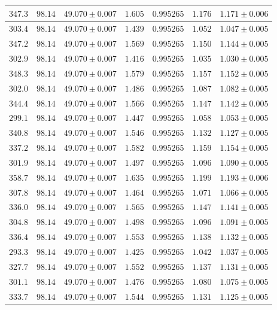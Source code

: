 \documentclass[]{article}
\begin{document}
\begin{table}
\begin{tabular}{||c|c|c|c|c|c|c||}
    $347.3$ & $98.14$ & $49.070 \pm 0.007$ & $1.605$ & $0.995265$ & $1.176$ & $1.171 \pm 0.006$ \\\hline
    $303.4$ & $98.14$ & $49.070 \pm 0.007$ & $1.439$ & $0.995265$ & $1.052$ & $1.047 \pm 0.005$ \\\hline
    $347.2$ & $98.14$ & $49.070 \pm 0.007$ & $1.569$ & $0.995265$ & $1.150$ & $1.144 \pm 0.005$ \\\hline
    $302.9$ & $98.14$ & $49.070 \pm 0.007$ & $1.416$ & $0.995265$ & $1.035$ & $1.030 \pm 0.005$ \\\hline
    $348.3$ & $98.14$ & $49.070 \pm 0.007$ & $1.579$ & $0.995265$ & $1.157$ & $1.152 \pm 0.005$ \\\hline
    $302.0$ & $98.14$ & $49.070 \pm 0.007$ & $1.486$ & $0.995265$ & $1.087$ & $1.082 \pm 0.005$ \\\hline
    $344.4$ & $98.14$ & $49.070 \pm 0.007$ & $1.566$ & $0.995265$ & $1.147$ & $1.142 \pm 0.005$ \\\hline
    $299.1$ & $98.14$ & $49.070 \pm 0.007$ & $1.447$ & $0.995265$ & $1.058$ & $1.053 \pm 0.005$ \\\hline
    $340.8$ & $98.14$ & $49.070 \pm 0.007$ & $1.546$ & $0.995265$ & $1.132$ & $1.127 \pm 0.005$ \\\hline
    $337.2$ & $98.14$ & $49.070 \pm 0.007$ & $1.582$ & $0.995265$ & $1.159$ & $1.154 \pm 0.005$ \\\hline
    $301.9$ & $98.14$ & $49.070 \pm 0.007$ & $1.497$ & $0.995265$ & $1.096$ & $1.090 \pm 0.005$ \\\hline
    $358.7$ & $98.14$ & $49.070 \pm 0.007$ & $1.635$ & $0.995265$ & $1.199$ & $1.193 \pm 0.006$ \\\hline
    $307.8$ & $98.14$ & $49.070 \pm 0.007$ & $1.464$ & $0.995265$ & $1.071$ & $1.066 \pm 0.005$ \\\hline
    $336.0$ & $98.14$ & $49.070 \pm 0.007$ & $1.565$ & $0.995265$ & $1.147$ & $1.141 \pm 0.005$ \\\hline
    $304.8$ & $98.14$ & $49.070 \pm 0.007$ & $1.498$ & $0.995265$ & $1.096$ & $1.091 \pm 0.005$ \\\hline
    $336.4$ & $98.14$ & $49.070 \pm 0.007$ & $1.553$ & $0.995265$ & $1.138$ & $1.132 \pm 0.005$ \\\hline
    $293.3$ & $98.14$ & $49.070 \pm 0.007$ & $1.425$ & $0.995265$ & $1.042$ & $1.037 \pm 0.005$ \\\hline
    $327.7$ & $98.14$ & $49.070 \pm 0.007$ & $1.552$ & $0.995265$ & $1.137$ & $1.131 \pm 0.005$ \\\hline
    $301.1$ & $98.14$ & $49.070 \pm 0.007$ & $1.476$ & $0.995265$ & $1.080$ & $1.075 \pm 0.005$ \\\hline
    $333.7$ & $98.14$ & $49.070 \pm 0.007$ & $1.544$ & $0.995265$ & $1.131$ & $1.125 \pm 0.005$ \\\hline


\end{tabular}
\end{table}
\end{document}
